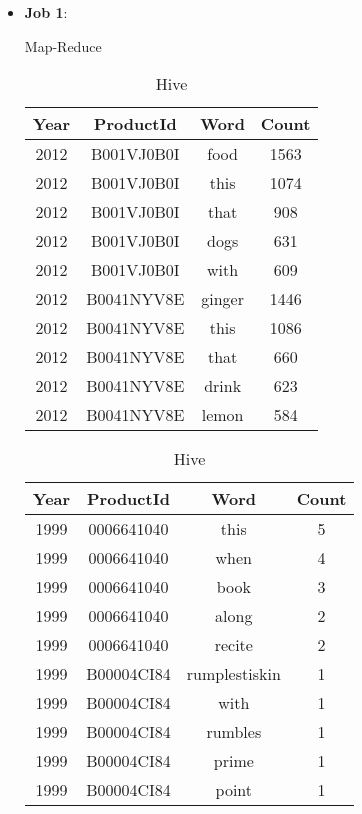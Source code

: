 \begin{itemize}
    \item \textbf{Job 1}:
    \begin{table}[!ht]
      \centering
      \begin{minipage}{.5\textwidth}
        \centering
        \caption{Map-Reduce}
        \begin{tabular}{cccc}
          \toprule
          Year & ProductId & Word & Count \\
          \midrule
          2012 & B001VJ0B0I & food & 1563 \\
          2012 & B001VJ0B0I & this & 1074 \\
          2012 & B001VJ0B0I & that & 908 \\
          2012 & B001VJ0B0I & dogs & 631 \\
          2012 & B001VJ0B0I & with & 609 \\
          2012 & B0041NYV8E & ginger & 1446 \\
          2012 & B0041NYV8E & this & 1086 \\
          2012 & B0041NYV8E & that & 660 \\
          2012 & B0041NYV8E & drink & 623 \\
          2012 & B0041NYV8E & lemon & 584 \\
          \bottomrule
        \end{tabular}
      \end{minipage}%
      \begin{minipage}{.5\textwidth}
        \centering
        \caption{Hive}
        \begin{tabular}{cccc}
          \toprule
          Year & ProductId & Word & Count \\
          \midrule
          1999 & 0006641040 & this & 5 \\
          1999 & 0006641040 & when & 4 \\
          1999 & 0006641040 & book & 3 \\
          1999 & 0006641040 & along & 2 \\
          1999 & 0006641040 & recite & 2 \\
          1999 & B00004CI84 & rumplestiskin & 1 \\
          1999 & B00004CI84 & with & 1 \\
          1999 & B00004CI84 & rumbles & 1 \\
          1999 & B00004CI84 & prime & 1 \\
          1999 & B00004CI84 & point & 1 \\
          \bottomrule
        \end{tabular}
      \end{minipage}
    \end{table}
    

\end{itemize}
